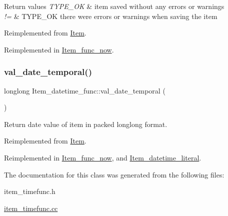 \begin{DoxyRetVals}{Return values}
{\em T\+Y\+P\+E\+\_\+\+OK} & item saved without any errors or warnings \\
\hline
{\em !=} & T\+Y\+P\+E\+\_\+\+OK there were errors or warnings when saving the item \\
\hline
\end{DoxyRetVals}


Reimplemented from \mbox{\hyperlink{classItem_a463ded5f3c21ed2508dd8fddc6024722}{Item}}.



Reimplemented in \mbox{\hyperlink{classItem__func__now_a8d1ad8eb628505c304c5e871c1c23dcc}{Item\+\_\+func\+\_\+now}}.

\mbox{\label{classItem__datetime__func_a10b03b1938f6aa1c40e1191fe304f943}} 
\subsubsection{\texorpdfstring{val\+\_\+date\+\_\+temporal()}{val\_date\_temporal()}}
{\footnotesize\ttfamily longlong Item\+\_\+datetime\+\_\+func\+::val\+\_\+date\+\_\+temporal (\begin{DoxyParamCaption}{ }\end{DoxyParamCaption})\hspace{0.3cm}{\ttfamily [virtual]}}

Return date value of item in packed longlong format. 

Reimplemented from \mbox{\hyperlink{classItem_a9174217a46706eb2db74689b5365c4a5}{Item}}.



Reimplemented in \mbox{\hyperlink{classItem__func__now_a0abcdd4d578abeacaa50a754563cbd9f}{Item\+\_\+func\+\_\+now}}, and \mbox{\hyperlink{classItem__datetime__literal_af205497e535eba297fbdd01b60bb93d9}{Item\+\_\+datetime\+\_\+literal}}.



The documentation for this class was generated from the following files\+:\begin{DoxyCompactItemize}
\item 
item\+\_\+timefunc.\+h\item 
\mbox{\hyperlink{item__timefunc_8cc}{item\+\_\+timefunc.\+cc}}\end{DoxyCompactItemize}
